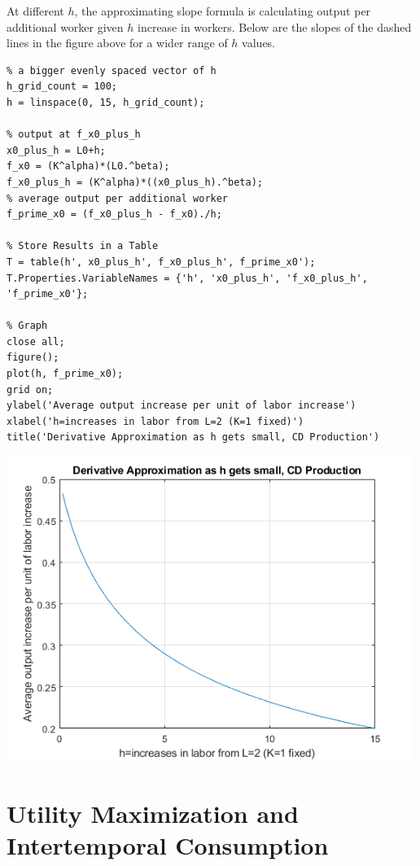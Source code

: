 \documentclass[
]{book}
\begin{document}
At different \(h\), the approximating slope formula is calculating output
per additional worker given \(h\) increase in workers. Below are the
slopes of the dashed lines in the figure above for a wider range of \(h\)
values.

\begin{verbatim}
% a bigger evenly spaced vector of h
h_grid_count = 100;
h = linspace(0, 15, h_grid_count);

% output at f_x0_plus_h
x0_plus_h = L0+h;
f_x0 = (K^alpha)*(L0.^beta);
f_x0_plus_h = (K^alpha)*((x0_plus_h).^beta);
% average output per additional worker
f_prime_x0 = (f_x0_plus_h - f_x0)./h;

% Store Results in a Table
T = table(h', x0_plus_h', f_x0_plus_h', f_prime_x0');
T.Properties.VariableNames = {'h', 'x0_plus_h', 'f_x0_plus_h', 'f_prime_x0'};

% Graph
close all;
figure();
plot(h, f_prime_x0);
grid on;
ylabel('Average output increase per unit of labor increase')
xlabel('h=increases in labor from L=2 (K=1 fixed)')
title('Derivative Approximation as h gets small, CD Production')
\end{verbatim}

\includegraphics[width=5.20833in,height=\textheight]{img/derivative_hslope_cobb_douglas_images/figure_2.png}

\vspace{1em}

\hypertarget{utility-maximization-and-intertemporal-consumption}{%
\section{Utility Maximization and Intertemporal Consumption}\label{utility-maximization-and-intertemporal-consumption}}
\end{document}

